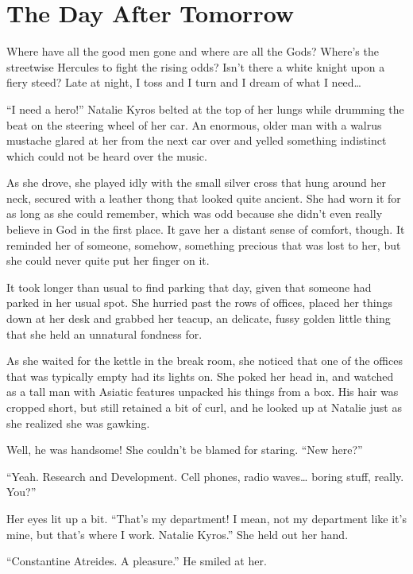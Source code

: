 \chapter{The Day After Tomorrow}


Where have all the good men gone
and where are all the Gods?
Where’s the streetwise Hercules to fight the rising odds?
Isn’t there a white knight upon a fiery steed?
Late at night, I toss and I turn and I dream of what I need…

“I need a hero!” Natalie Kyros belted at the top of her lungs while drumming the beat on the steering wheel of her car. An enormous, older man with a walrus mustache glared at her from the next car over and yelled something indistinct which could not be heard over the music.

As she drove, she played idly with the small silver cross that hung around her neck, secured with a leather thong that looked quite ancient. She had worn it for as long as she could remember, which was odd because she didn’t even really believe in God in the first place. It gave her a distant sense of comfort, though. It reminded her of someone, somehow, something precious that was lost to her, but she could never quite put her finger on it.

It took longer than usual to find parking that day, given that someone had parked in her usual spot. She hurried past the rows of offices, placed her things down at her desk and grabbed her teacup, an delicate, fussy golden little thing that she held an unnatural fondness for.

As she waited for the kettle in the break room, she noticed that one of the offices that was typically empty had its lights on. She poked her head in, and watched as a tall man with Asiatic features unpacked his things from a box. His hair was cropped short, but still retained a bit of curl, and he looked up at Natalie just as she realized she was gawking.

Well, he was handsome! She couldn’t be blamed for staring. “New here?”

“Yeah. Research and Development. Cell phones, radio waves… boring stuff, really. You?”

Her eyes lit up a bit. “That’s my department! I mean, not my department like it’s mine, but that’s where I work. Natalie Kyros.” She held out her hand.

“Constantine Atreides. A pleasure.” He smiled at her.

